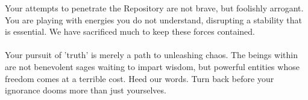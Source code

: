 \documentclass{article}
\begin{document}
\begin{infobox}
Your attempts to penetrate the Repository are not brave, but foolishly arrogant. You are playing with energies you do not understand, disrupting a stability that is essential. We have sacrificed much to keep these forces contained. \\
\\
Your pursuit of 'truth' is merely a path to unleashing chaos. The beings within are not benevolent sages waiting to impart wisdom, but powerful entities whose freedom comes at a terrible cost. Heed our words. Turn back before your ignorance dooms more than just yourselves.
\end{infobox}
\end{document}
